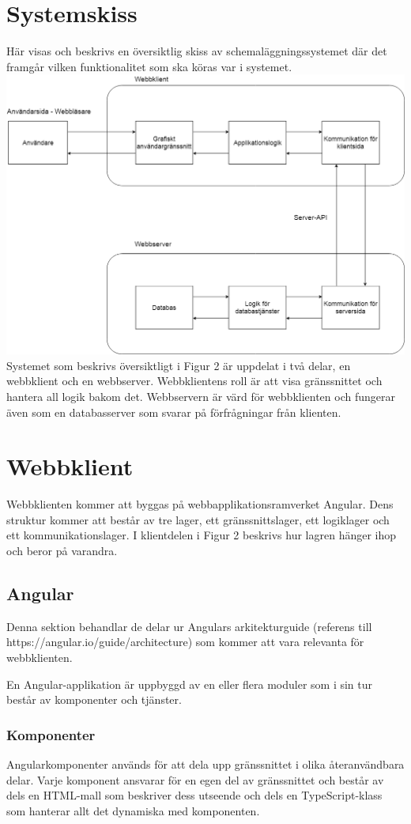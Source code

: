 \documentclass[a4paper,10pt]{article}
\begin{document}
\section{Systemskiss}
\label{sec:Systemskiss}
Här visas och beskrivs en översiktlig skiss av schemaläggningssystemet där det framgår vilken funktionalitet som ska köras var i systemet. \\
\includegraphics[width=.9\linewidth,height=.7\textheight]{Systemskiss.png}
\\
Systemet som beskrivs översiktligt i Figur 2 är uppdelat i två delar, en webbklient och en webbserver. Webbklientens roll är att visa gränssnittet och hantera all logik bakom det. Webbservern är värd för webbklienten och fungerar även som en databasserver som svarar på förfrågningar från klienten.
\section{Webbklient}
Webbklienten kommer att byggas på webbapplikationsramverket Angular. Dens struktur kommer att består av tre lager, ett gränssnittslager, ett logiklager och ett kommunikationslager. I klientdelen i Figur 2 beskrivs hur lagren hänger ihop och beror på varandra.

\subsection{Angular}
Denna sektion behandlar de delar ur Angulars arkitekturguide (referens till https://angular.io/guide/architecture) som kommer att vara relevanta för webbklienten.

En Angular-applikation är uppbyggd av en eller flera moduler som i sin tur består av komponenter och tjänster.
\subsubsection{Komponenter}
\label{komponent}
Angularkomponenter används för att dela upp gränssnittet i olika återanvändbara delar. Varje komponent ansvarar för en egen del av gränssnittet och består av dels en HTML-mall som beskriver dess utseende och dels en TypeScript-klass som hanterar allt det dynamiska med komponenten.
\end{document}
